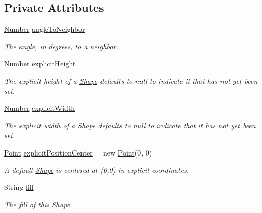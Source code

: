\subsection*{Private Attributes}
\begin{DoxyCompactItemize}
\item 
\hyperlink{interfacecom_1_1aarrelaakso_1_1drawl_1_1_number}{Number} \hyperlink{classcom_1_1aarrelaakso_1_1drawl_1_1_shape_a0281d9f3d35d7ff5db2be3c3f9362c9f}{angle\+To\+Neighbor}
\begin{DoxyCompactList}\small\item\em The angle, in degrees, to a neighbor. \end{DoxyCompactList}\item 
\hyperlink{interfacecom_1_1aarrelaakso_1_1drawl_1_1_number}{Number} \hyperlink{classcom_1_1aarrelaakso_1_1drawl_1_1_shape_aa153ceaedb47e7aa504cd52a556dc7ac}{explicit\+Height}
\begin{DoxyCompactList}\small\item\em The explicit height of a \hyperlink{classcom_1_1aarrelaakso_1_1drawl_1_1_shape}{Shape} defaults to {\ttfamily null} to indicate it that has not yet been set. \end{DoxyCompactList}\item 
\hyperlink{interfacecom_1_1aarrelaakso_1_1drawl_1_1_number}{Number} \hyperlink{classcom_1_1aarrelaakso_1_1drawl_1_1_shape_af297289dcb30e099587976e95431e327}{explicit\+Width}
\begin{DoxyCompactList}\small\item\em The explicit width of a \hyperlink{classcom_1_1aarrelaakso_1_1drawl_1_1_shape}{Shape} defaults to {\ttfamily null} to indicate that it has not yet been set. \end{DoxyCompactList}\item 
\hyperlink{classcom_1_1aarrelaakso_1_1drawl_1_1_point}{Point} \hyperlink{classcom_1_1aarrelaakso_1_1drawl_1_1_shape_ab843843602722cca47778675d5d77bb5}{explicit\+Position\+Center} = new \hyperlink{classcom_1_1aarrelaakso_1_1drawl_1_1_point}{Point}(0, 0)
\begin{DoxyCompactList}\small\item\em A default \hyperlink{classcom_1_1aarrelaakso_1_1drawl_1_1_shape}{Shape} is centered at (0,0) in explicit coordinates. \end{DoxyCompactList}\item 
String \hyperlink{classcom_1_1aarrelaakso_1_1drawl_1_1_shape_ade398fbc41c7814eebb5b4c7a62861f6}{fill}
\begin{DoxyCompactList}\small\item\em The fill of this \hyperlink{classcom_1_1aarrelaakso_1_1drawl_1_1_shape}{Shape}. \end{DoxyCompactList}\item 

\end{DoxyCompactItemize}
